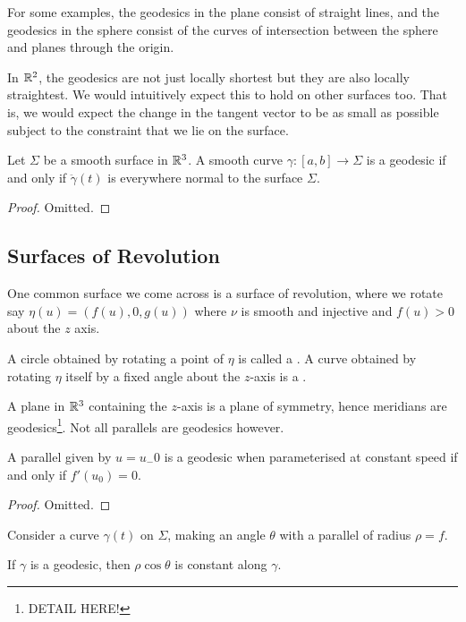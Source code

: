 \documentclass[a4paper]{article}
\begin{document}
For some examples, the geodesics in the plane consist of straight lines, and the geodesics in the sphere consist of the curves of intersection between the sphere and planes through the origin.

In $\mathbb{R}^2$, the geodesics are not just locally shortest but they are also locally straightest. We would intuitively expect this to hold on other surfaces too. That is, we would expect the change in the tangent vector to be as small as possible subject to the constraint that we lie on the surface.

\begin{theorem}
    Let $\Sigma$ be a smooth surface in $\mathbb{R}^3$. A smooth curve $\gamma:[a, b] \rightarrow \Sigma$ is a geodesic if and only if $\ddot{\gamma}(t)$ is everywhere normal to the surface $\Sigma$.
\end{theorem}
\begin{proof}
    Omitted.
\end{proof}

\subsection{Surfaces of Revolution}

One common surface we come across is a surface of revolution, where we rotate say $\eta(u) = (f(u), 0, g(u))$ where $\nu$ is smooth and injective and $f(u)> 0$ about the $z$ axis.

\begin{definition}
A circle obtained by rotating a point of $\eta$ is called a . A curve obtained by rotating $\eta$ itself by a fixed angle about the $z$-axis is a .
\end{definition}

A plane in $\mathbb{R}^3$ containing the $z$-axis is a plane of symmetry, hence meridians are geodesics\footnote{\color{red} DETAIL HERE!}. Not all parallels are geodesics however.

\begin{lemma}
    A parallel given by $u = u_-0$ is a geodesic when parameterised at constant speed if and only if $f'(u_0) = 0$.
\end{lemma}
\begin{proof}
    Omitted.
\end{proof}

Consider a curve $\gamma(t)$ on $\Sigma$, making an angle $\theta$ with a parallel of radius $\rho = f$.

\begin{theorem}
    If $\gamma$ is a geodesic, then $\rho \cos \theta$ is constant along $\gamma$.
\end{theorem}
\end{document}
